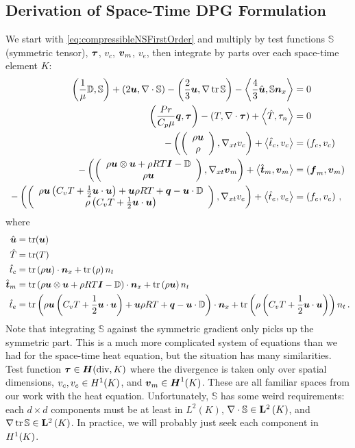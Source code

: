 \documentclass[Proposal.tex]{subfiles}
\begin{document}
\subsection{Derivation of Space-Time DPG Formulation}
We start with \eqref{eq:compressibleNSFirstOrder} and multiply by test functions $\mathbb{S}$ (symmetric tensor), $\boldsymbol\tau$, $v_c$, $\boldsymbol v_m$, $v_e$, 
then integrate by parts over each space-time element $K$:
\begin{subequations}
\label{eq:compressibleNSBF}
\begin{align}
	\left( \frac{1}{\mu}\mathbb{D},\mathbb{S} \right)+\left( 2\boldsymbol u,\nabla\cdot\mathbb{S} \right)-\left( \frac{2}{3}\boldsymbol u,\nabla\operatorname*{tr}{\mathbb{S}} \right)
	-\left\langle \frac{4}{3}\hat{\boldsymbol u},\mathbb{S}\boldsymbol n_x \right\rangle&=0\\
	\left( \frac{Pr}{C_p\mu}\boldsymbol q,\boldsymbol\tau \right)-\left( T,\nabla\cdot\boldsymbol\tau \right)+\left\langle \hat T,\tau_n \right\rangle&=0\\
	-\left( \left( \begin{array}{c} \rho\boldsymbol u\\ \rho\\ \end{array} \right),\nabla_{xt} v_c \right)+\left\langle \hat t_c,v_c \right\rangle&=\left( f_c,v_c \right)\\
	-\left( \left( \begin{array}{c} \rho\boldsymbol u\otimes\boldsymbol u+\rho RT\boldsymbol I-\mathbb{D}\\ \rho\boldsymbol u\\ \end{array} \right),\nabla_{xt}\boldsymbol v_m \right)+\left\langle \hat{\boldsymbol t}_m,\boldsymbol v_m \right\rangle&=\left( \boldsymbol f_m,\boldsymbol v_m \right)\\
	-\left( \left( \begin{array}{c} \rho\boldsymbol u\left( C_v T+\frac{1}{2}\boldsymbol u\cdot\boldsymbol u \right)+\boldsymbol u\rho RT+\boldsymbol q-\boldsymbol u\cdot\mathbb{D}\\ \rho\left( C_v T+\frac{1}{2}\boldsymbol u\cdot\boldsymbol u \right)\\ \end{array} \right),\nabla_{xt} v_e \right)
	+\left\langle \hat t_e,v_e \right\rangle&=\left( f_e,v_e \right)\,,
\end{align}
\end{subequations}
where 
\begin{equation*}
\begin{aligned}
\hat{\boldsymbol u}&=\operatorname*{tr}(\boldsymbol u)\\
\hat T&=\operatorname*{tr}(T)\\
\hat t_c&=\operatorname*{tr}\left( \rho\boldsymbol u \right)\cdot\boldsymbol n_x
+\operatorname*{tr}\left( \rho \right)n_t\\
\hat{\boldsymbol t}_m&=\operatorname*{tr}\left( \rho\boldsymbol u\otimes\boldsymbol u+\rho RT\boldsymbol I-\mathbb{D} \right)\cdot\boldsymbol n_x
+\operatorname*{tr}\left( \rho\boldsymbol u \right) n_t\\
\hat t_e&=\operatorname*{tr}\left( \rho\boldsymbol u\left( C_v T+\frac{1}{2}\boldsymbol u\cdot\boldsymbol u \right)+\boldsymbol u\rho RT+\boldsymbol q-\boldsymbol u\cdot\mathbb{D} \right)\cdot\boldsymbol n_x
+\operatorname*{tr}\left( \rho\left( C_v T+\frac{1}{2}\boldsymbol u\cdot\boldsymbol u \right) \right)n_t\,.
\end{aligned}
\end{equation*}
Note that integrating $\mathbb{S}$ against the symmetric gradient only picks up the symmetric part.
This is a much more complicated system of equations than we had for the space-time heat equation, but the situation has many similarities.
Test function $\boldsymbol\tau\in\mbox{\boldmath $H$}(\text{div},K)$ where the divergence is taken only over spatial dimensions, $v_c,v_e\in H^{1}(K)$, and $\boldsymbol v_m\in\mbox{\boldmath $H$}^{1}(K)$.
These are all familiar spaces from our work with the heat equation.
Unfortunately, $\mathbb{S}$ has some weird requirements: each $d\times d$ components must be at least in $L^2(K)$, $\nabla\cdot\mathbb{S}\in\mathbf{L}^2\left( K \right)$, and
$\nabla\operatorname*{tr}{\mathbb{S}}\in\mathbf{L}^2\left( K \right)$.
In practice, we will probably just seek each component in $H^{1}(K)$.
\end{document}
